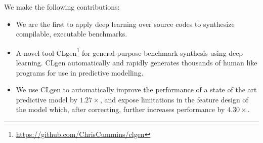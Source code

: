 We make the following contributions:%
\begin{itemize}
  \item We are the first to apply deep learning over source codes to synthesize compilable, executable benchmarks.%
  \item A novel tool CLgen\footnote{\url{https://github.com/ChrisCummins/clgen}} for general-purpose benchmark synthesis using deep learning. CLgen automatically and rapidly generates thousands of human like programs for use in predictive modelling.%
  \item We use CLgen to automatically improve the performance of a state of the art predictive model by $1.27\times$, and expose limitations in the feature design of the model which, after correcting, further increases performance by $4.30\times$.%
\end{itemize}

